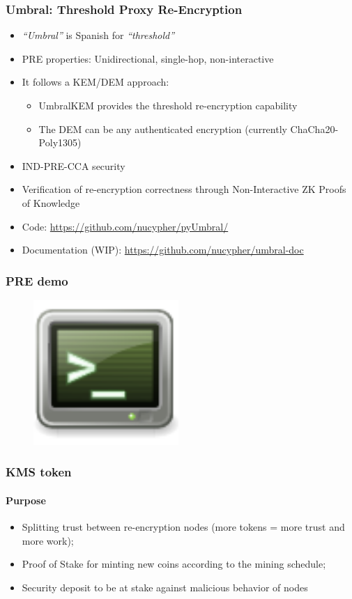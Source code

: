 \documentclass[xetex,mathsans,sans,aspectratio=169]{beamer}
\begin{document}
    \begin{frame}
        \frametitle{Umbral: Threshold Proxy Re-Encryption}
        \begin{itemize}
        	\item \emph{``Umbral''} is Spanish for \emph{``threshold''}
            \item PRE properties: Unidirectional, single-hop, non-interactive
            \item It follows a KEM/DEM approach:
            	\begin{itemize}
					\item UmbralKEM provides the threshold re-encryption capability
            		\item The DEM can be any authenticated encryption (currently ChaCha20-Poly1305)
        		\end{itemize}
			\item IND-PRE-CCA security
			\item Verification of re-encryption correctness through Non-Interactive ZK Proofs of Knowledge
			\item Code: \url{https://github.com/nucypher/pyUmbral/}
			\item Documentation (WIP): \url{https://github.com/nucypher/umbral-doc}
        \end{itemize}
    \end{frame}

    \begin{frame}
        \frametitle{PRE demo}
        \begin{figure}
            \centering
            \includegraphics[height=5.5cm]{pdf/terminal.pdf}
        \end{figure}
    \end{frame}

    \begin{frame}
        \frametitle{KMS token}
        \framesubtitle{Purpose}
        \begin{itemize}
            \item Splitting trust between re-encryption nodes (more tokens = more trust and more work);
            \item Proof of Stake for minting new coins according to the mining schedule;
            \item Security deposit to be at stake against malicious behavior of nodes
        \end{itemize}
    \end{frame}
\end{document}
